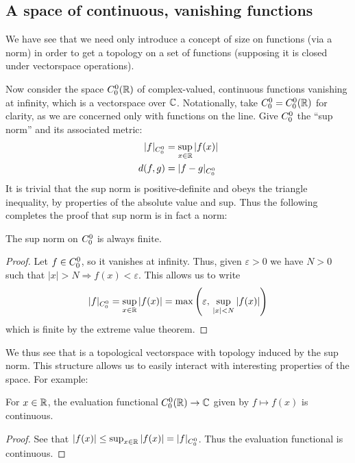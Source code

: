       \subsection{A space of continuous, vanishing functions}

      We have see that we need only introduce a concept of size on functions (via a norm) in order to get a topology on a set of functions (supposing it is closed under vectorspace operations).

      Now consider the space ${C^0_0}(\mathbb{R})$ of complex-valued, continuous functions vanishing at infinity, which is a vectorspace over $\mathbb{C}$.
      Notationally, take ${C^0_0}={C^0_0}(\mathbb{R})$ for clarity, as we are concerned only with functions on the line.
      Give ${C^0_0}$ the ``sup norm'' and its associated metric:
      \begin{align*}
        |f|_{C^0_0} &= \sup_{x\in\mathbb{R}}|f(x)|\\
        d(f,g) &= |f-g|_{C^0_0}
      \end{align*}
      It is trivial that the sup norm is positive-definite and obeys the triangle inequality, by properties of the absolute value and sup.
      Thus the following completes the proof that sup norm is in fact a norm:
      \begin{claim}
        The sup norm on ${C^0_0}$ is always finite.
        \begin{proof}
          Let $f\in {C^0_0}$, so it vanishes at infinity.
          Thus, given $\varepsilon>0$ we have $N>0$ such that $|x|>N\Rightarrow f(x)<\varepsilon$.
          This allows us to write
          \begin{align*}
            |f|_{C^0_0}
            = \sup_{x\in\mathbb{R}}|f(x)|
            = \max\left(\varepsilon,\,\sup_{|x|<N}|f(x)|\right)
          \end{align*}
          which is finite by the extreme value theorem.
        \end{proof}
      \end{claim}
      We thus see that \Coo is a topological vectorspace with topology induced by the sup norm.
      This structure allows us to easily interact with interesting properties of the space.
      For example:
      \begin{claim}
        For $x\in\mathbb{R}$, the evaluation functional ${C^0_0}(\mathbb{R})\rightarrow\mathbb{C}$ given by $f\mapsto f(x)$ is continuous.
        \begin{proof}
          See that $|f(x)| \le \sup_{x\in\mathbb{R}} |f(x)| = |f|_{C^0_0}$.
          Thus the evaluation functional is continuous.
        \end{proof}
      \end{claim}

